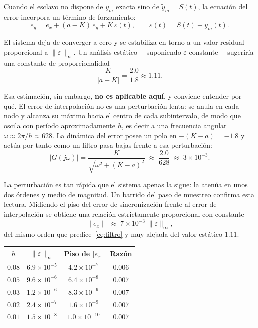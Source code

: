 \documentclass[12pt,a4paper]{article}
\begin{document}
Cuando el esclavo no dispone de $y_m$ exacta sino de $\tilde{y}_m = S(t)$, la ecuación del error incorpora un término de forzamiento:
\begin{equation}
\dot{e}_y = e_x + (a - K)\,e_y + K\,\varepsilon(t),
\qquad \varepsilon(t) = S(t) - y_m(t).
\label{eq:forzado}
\end{equation}

El sistema deja de converger a cero y se estabiliza en torno a un valor residual proporcional a $\|\varepsilon\|_{\infty}$. Un análisis estático —suponiendo $\varepsilon$ constante— sugeriría una constante de proporcionalidad
\begin{equation}
\frac{K}{|a - K|} = \frac{2.0}{1.8} \approx 1.11 .
\end{equation}

Esa estimación, sin embargo, \textbf{no es aplicable aquí}, y conviene entender por qué. El error de interpolación no es una perturbación lenta: se anula en cada nodo y alcanza su máximo hacia el centro de cada subintervalo, de modo que oscila con período aproximadamente $h$, es decir a una frecuencia angular $\omega \approx 2\pi/h \approx 628$. La dinámica del error posee un polo en $-(K-a) = -1.8$ y actúa por tanto como un filtro pasa-bajas frente a esa perturbación:
\begin{equation}
|G(j\omega)| = \frac{K}{\sqrt{\omega^2 + (K-a)^2}}
\;\approx\; \frac{2.0}{628} \;\approx\; 3\times 10^{-3}.
\label{eq:filtro}
\end{equation}

La perturbación es tan rápida que el sistema apenas la sigue: la atenúa en unos dos órdenes y medio de magnitud. Un barrido del paso de muestreo confirma esta lectura. Midiendo el piso del error de sincronización frente al error de interpolación se obtiene una relación estrictamente proporcional con constante
\begin{equation}
\|e_x\| \;\approx\; 7\times 10^{-3}\;\|\varepsilon\|_{\infty},
\end{equation}
del mismo orden que predice~\eqref{eq:filtro} y muy alejada del valor estático $1.11$.

\begin{center}
\begin{tabularx}{0.9\textwidth}{@{}c c c c@{}}
\toprule
$h$ & $\|\varepsilon\|_{\infty}$ & \textbf{Piso de $|e_x|$} & \textbf{Razón} \\
\midrule
$0.08$ & $6.9\times10^{-5}$ & $4.2\times10^{-7}$  & $0.006$ \\
$0.05$ & $9.6\times10^{-6}$ & $6.4\times10^{-8}$  & $0.007$ \\
$0.03$ & $1.2\times10^{-6}$ & $8.3\times10^{-9}$  & $0.007$ \\
$0.02$ & $2.4\times10^{-7}$ & $1.6\times10^{-9}$  & $0.007$ \\
$0.01$ & $1.5\times10^{-8}$ & $1.0\times10^{-10}$ & $0.007$ \\
\bottomrule
\end{tabularx}
\end{center}
\end{document}

